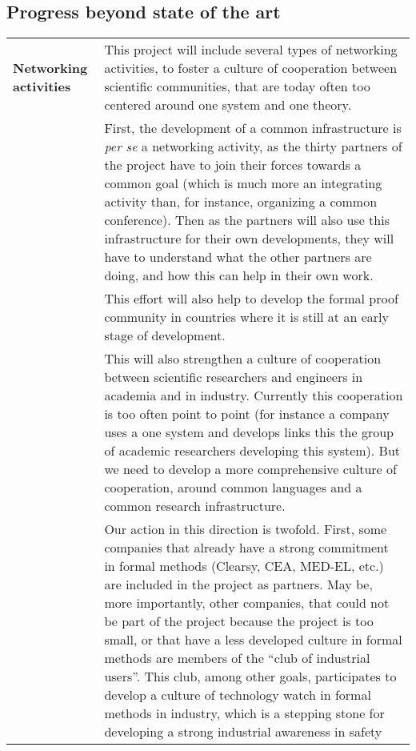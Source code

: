 \subsection{Progress beyond state of the art}


\begin{longtable}{|p{}|p{}|}
\hline
{\bf Networking activities}
&
This project will include several types of networking activities, to
foster a culture of cooperation between scientific communities, that
are today often too centered around one system and one theory.\\
&
\hspace{0.4cm}
First, the development of a common infrastructure is \emph{per se} a
networking activity, as the thirty partners of the project have to join
their forces towards a common goal (which is much more an integrating
activity than, for instance, organizing a common conference). Then as
the partners will also use this infrastructure for their own
developments, they will have to understand what the other partners are
doing, and how this can help in their own work.\\
&
\hspace{0.4cm}
This effort will also help to develop the formal proof community in
countries where it is still at an early stage of development.\\
&
\hspace{0.4cm}
This will also strengthen a culture of cooperation between scientific
researchers and engineers in academia and in industry. Currently this
cooperation is too often point to point (for instance a company uses a
one system and develops links this the group of academic researchers
developing this system). But we need to develop a more comprehensive
culture of cooperation, around common languages and a common research
infrastructure.\\
&
\hspace{0.4cm}
Our action in this direction is twofold. First, some companies that
already have a strong commitment in formal methods (Clearsy, CEA,
MED-EL, etc.) are included in the project as partners. May be, more
importantly, other companies, that could not be part of the project
because the project is too small, or that have a less developed
culture in formal methods are members of the ``club of industrial
users''. This club, among other goals, participates to develop a
culture of technology watch in formal methods in industry, which is a
stepping stone for developing a strong industrial awareness in safety

\end{longtable}
